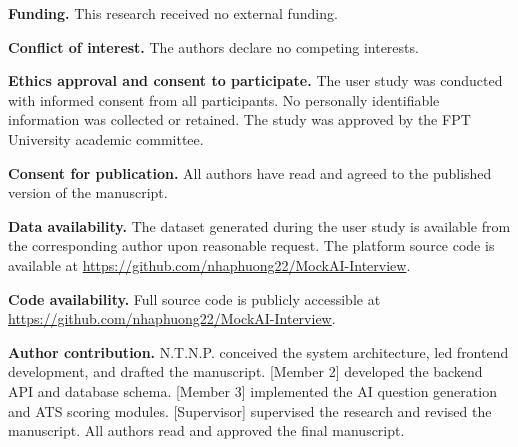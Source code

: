 \documentclass[pdflatex,sn-mathphys-num]{sn-jnl}%
\theoremstyle{thmstyleone}%
\theoremstyle{thmstyletwo}%
\theoremstyle{thmstylethree}%
\begin{document}
\textbf{Funding.} This research received no external funding.

\textbf{Conflict of interest.} The authors declare no competing interests.

\textbf{Ethics approval and consent to participate.} The user study was conducted with informed consent from all participants. No personally identifiable information was collected or retained. The study was approved by the FPT University academic committee.

\textbf{Consent for publication.} All authors have read and agreed to the published version of the manuscript.

\textbf{Data availability.} The dataset generated during the user study is available from the corresponding author upon reasonable request. The platform source code is available at \url{https://github.com/nhaphuong22/MockAI-Interview}.

\textbf{Code availability.} Full source code is publicly accessible at \url{https://github.com/nhaphuong22/MockAI-Interview}.

\textbf{Author contribution.} N.T.N.P. conceived the system architecture, led frontend development, and drafted the manuscript. [Member 2] developed the backend API and database schema. [Member 3] implemented the AI question generation and ATS scoring modules. [Supervisor] supervised the research and revised the manuscript. All authors read and approved the final manuscript.


\end{document}

